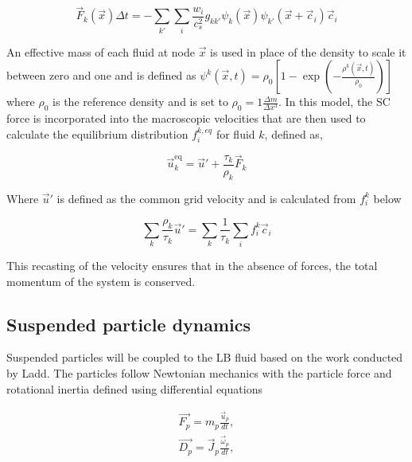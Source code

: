 \begin{equation}
\vec{F}_k(\vec{x}) \Delta t = - \sum_{k'} \sum_i \frac{w_i}{c_s^2} g_{kk'} \psi_k(\vec{x})\psi_{k'}(\vec{x}+\vec{c}_i) \vec{c}_i
\label{eq:sc_model}
\end{equation}

An effective mass of each fluid at node $\vec{x}$ is used in place of the density to scale it between zero 
and one and is defined as $\psi^{k}(\vec{x},t) = \rho_{0}\left[1 - \exp(-\frac{\rho^{k}(\vec{x}, t)}{\rho_{0}})\right]$ where
$\rho_0$ is the reference density and is set to $\rho_0 = 1 \frac{\Delta m}{\Delta x^3}$. 
In this model, the SC force is incorporated into the macroscopic velocities that are then used to calculate the equilibrium
distribution $f_{i}^{k, eq}$ for fluid $k$, defined as,

\begin{equation}
\vec{u}_k^{\text{eq}} = \vec{u}' + \frac{\tau_k}{\rho_k} \vec{F}_k
\end{equation}

Where $\vec{u}'$ is defined as the common grid velocity and is calculated from $f_i^k$ below

\begin{equation}
    \sum_k \frac{\rho_k}{\tau_k} \vec{u}' = \sum_k \frac{1}{\tau_k}\sum_i f_i^k\vec{c}_i
\end{equation}

This recasting of the velocity ensures that in the absence of forces, the total momentum of the system is conserved. 


\subsection{Suspended particle dynamics}
\label{section:lbm_colloids}

Suspended particles will be coupled to the LB fluid based on the work conducted by Ladd. \cite{ladd_numerical_1994, 
aidun_direct_1998, ladd_lattice-boltzmann_2001} The particles follow Newtonian mechanics with the particle force and
rotational inertia defined using differential equations

\begin{equation}
    \begin{split}
    \vec{F_p} = m_p \frac{\vec{u}_p}{dt} , \\
    \vec{D_p} = \vec{J}_p \frac{\vec{\omega}_p}{dt} ,
    \label{eq:md}
    \end{split}
\end{equation}

